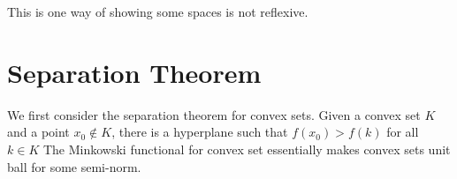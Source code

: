 \begin{remark}
	This is one way of showing some spaces is not reflexive.
\end{remark}

\section{Separation Theorem}
We first consider the separation theorem for convex sets. Given a convex set \(K\) and a point \(x_0 \notin K\), there is a hyperplane such that \(f(x_0) > f(k)\) for all \(k\in K\) The Minkowski functional for convex set essentially makes convex sets unit ball for some semi-norm.